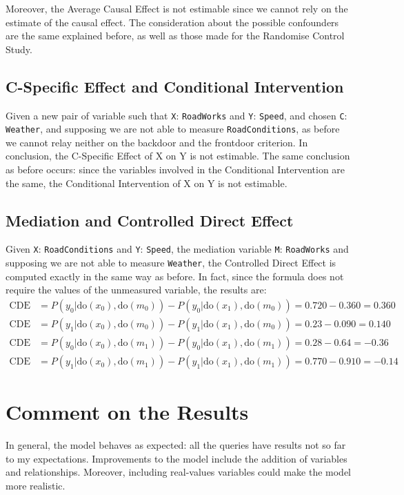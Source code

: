 \documentclass[a4paper,12pt]{article} %
\begin{document}
Moreover, the Average Causal Effect is not estimable since we cannot rely on the estimate of the causal effect. The consideration about the possible confounders are the same explained before, as well as those made for the Randomise Control Study.

\subsection*{C-Specific Effect and Conditional Intervention}
Given a new pair of variable such that \texttt{X}: \texttt{RoadWorks} and \texttt{Y}: \texttt{Speed}, and chosen \texttt{C}: \texttt{Weather}, and supposing we are not able to measure \texttt{RoadConditions}, as before we cannot relay neither on the backdoor and the frontdoor criterion. In conclusion, the C-Specific Effect of X on Y is not estimable.
The same conclusion as before occurs: since the variables involved in the Conditional Intervention are the same, the Conditional Intervention of X on Y is not estimable.

\subsection*{Mediation and Controlled Direct Effect}
Given \texttt{X}: \texttt{RoadConditions} and \texttt{Y}: \texttt{Speed}, the mediation variable \texttt{M}: \texttt{RoadWorks} and supposing we are not able to measure \texttt{Weather}, the Controlled Direct Effect is computed exactly in the same way as before. In fact, since the formula does not require the values of the unmeasured variable, the results are:
\begin{equation*}
\begin{aligned}
\text{CDE} &= P(y_0|\mathrm{do}(x_0),\mathrm{do}(m_0)) - P(y_0|\mathrm{do}(x_1),\mathrm{do}(m_0)) = 0.720 - 0.360 = 0.360\\
\text{CDE} &= P(y_1|\mathrm{do}(x_0),\mathrm{do}(m_0)) - P(y_1|\mathrm{do}(x_1),\mathrm{do}(m_0))= 0.23 - 0.090 = 0.140\\
\text{CDE} &= P(y_0|\mathrm{do}(x_0),\mathrm{do}(m_1)) - P(y_0|\mathrm{do}(x_1),\mathrm{do}(m_1))=0.28 - 0.64 = -0.36\\
\text{CDE} &= P(y_1|\mathrm{do}(x_0),\mathrm{do}(m_1)) - P(y_1|\mathrm{do}(x_1),\mathrm{do}(m_1))=0.770 - 0.910 = -0.14
\end{aligned}
\end{equation*}

\section{Comment on the Results}
In general, the model behaves as expected: all the queries have results not so far to my expectations.  
Improvements to the model include the addition of variables and relationships. Moreover, including real-values variables could make the model more realistic.
\end{document}
